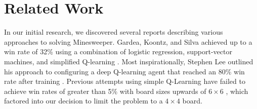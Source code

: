 \section{Related Work}

In our initial research, we discovered several reports describing various approaches to solving Minesweeper.
Gardea, Koontz, and Silva achieved up to a win rate of 32\% using a combination of logistic regression, support-vector machines, and simplified Q-learning \cite{gardea}.
Most inspirationally, Stephen Lee outlined his approach to configuring a deep Q-learning agent that reached an 80\% win rate after training \cite{lee}. 
Previous attempts using simple Q-Learning have failed to achieve win rates of greater than 5\% with board sizes upwards of $6\times6$ \cite{mehta}, which factored into our decision to limit the problem to a $4\times4$ board.
